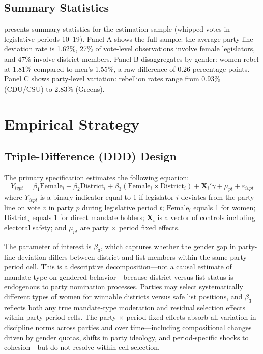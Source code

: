 \documentclass[12pt]{article}
\begin{document}
\subsection{Summary Statistics}

 presents summary statistics for the estimation sample (whipped votes in legislative periods 10--19). Panel A shows the full sample: the average party-line deviation rate is 1.62\%, 27\% of vote-level observations involve female legislators, and 47\% involve district members. Panel B disaggregates by gender: women rebel at 1.81\% compared to men's 1.55\%, a raw difference of 0.26 percentage points. Panel C shows party-level variation: rebellion rates range from 0.93\% (CDU/CSU) to 2.83\% (Greens).




\section{Empirical Strategy}\label{sec:strategy}

\subsection{Triple-Difference (DDD) Design}

The primary specification estimates the following equation:
\begin{equation}\label{eq:ddd}
Y_{ivpt} = \beta_1 \text{Female}_i + \beta_2 \text{District}_i + \beta_3 (\text{Female}_i \times \text{District}_i) + \mathbf{X}_i'\gamma + \mu_{pt} + \varepsilon_{ivpt}
\end{equation}
where $Y_{ivpt}$ is a binary indicator equal to 1 if legislator $i$ deviates from the party line on vote $v$ in party $p$ during legislative period $t$; $\text{Female}_i$ equals 1 for women; $\text{District}_i$ equals 1 for direct mandate holders; $\mathbf{X}_i$ is a vector of controls including electoral safety; and $\mu_{pt}$ are party $\times$ period fixed effects.

The parameter of interest is $\beta_3$, which captures whether the gender gap in party-line deviation differs between district and list members within the same party-period cell. This is a descriptive decomposition---not a causal estimate of mandate type on gendered behavior---because district versus list status is endogenous to party nomination processes. Parties may select systematically different types of women for winnable districts versus safe list positions, and $\beta_3$ reflects both any true mandate-type moderation and residual selection effects within party-period cells. The party $\times$ period fixed effects absorb all variation in discipline norms across parties and over time---including compositional changes driven by gender quotas, shifts in party ideology, and period-specific shocks to cohesion---but do not resolve within-cell selection.
\end{document}

